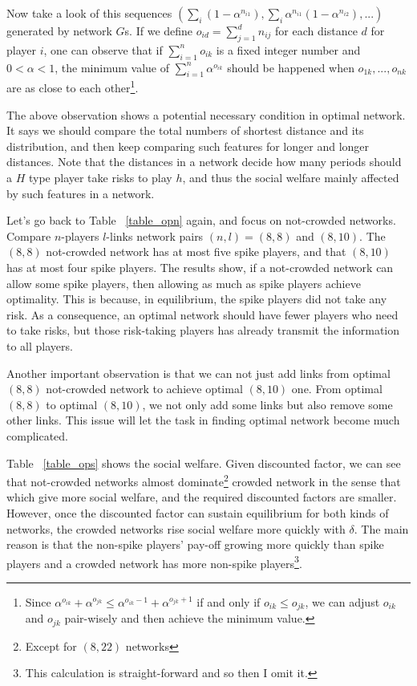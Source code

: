 \documentclass[12pt,letter]{article}
\theoremstyle{remark}
\theoremstyle{remark}
\theoremstyle{claim}
\begin{document}
Now take a look of this sequences $(\sum_i(1-\alpha^{n_{i1}}), \sum_i\alpha^{n_{i1}}(1-\alpha^{n_{i2}}),...)$ generated by network $G$s. If we define $o_{id}=\sum^d_{j=1} n_{ij}$ for each distance $d$ for player $i$, one can observe that if $\sum^n_{i=1} o_{ik}$ is a fixed integer number and $0<\alpha<1$, the minimum value of $\sum^n_{i=1}\alpha^{o_{ik}}$ should be happened when $o_{1k},...,o_{nk}$ are as close to each other\footnote{Since $\alpha^{o_{ik}}+\alpha^{o_{jk}}\leq \alpha^{o_{ik}-1}+\alpha^{o_{jk}+1}$ if and only if $o_{ik}\leq o_{jk}$, we can adjust $o_{ik}$ and $o_{jk}$ pair-wisely and then achieve the minimum value.}. 

The above observation shows a potential necessary condition in optimal network. It says we should compare the total numbers of shortest distance and its distribution, and then keep comparing such features for longer and longer distances. Note that the distances in a network decide how many periods should a $H$ type player take risks to play $h$, and thus the social welfare mainly affected by such features in a network.  

Let's go back to Table ~\ref{table_opn} again, and focus on not-crowded networks. Compare $n$-players $l$-links network pairs $(n,l)=(8,8)$ and $(8,10)$. The $(8,8)$ not-crowded network has at most five spike players, and that $(8,10)$ has at most four spike players. The results show, if a not-crowded network can allow some spike players, then allowing as much as spike players achieve optimality. This is because, in equilibrium, the spike players did not take any risk. As a consequence, an optimal network should have fewer players who need to take risks, but those risk-taking players has already transmit the information to all players. 

Another important observation is that we can not just add links from optimal $(8,8)$ not-crowded network to achieve optimal $(8,10)$ one. From optimal $(8,8)$ to optimal $(8,10)$, we not only add some links but also remove some other links. This issue will let the task in finding optimal network become much complicated. 

Table ~\ref{table_ops} shows the social welfare. Given discounted factor, we can see that not-crowded networks almost dominate\footnote{Except for $(8,22)$ networks} crowded network in the sense that which give more social welfare, and the required discounted factors are smaller. However, once the discounted factor can sustain equilibrium for both kinds of networks, the crowded networks rise social welfare more quickly with $\delta$. The main reason is that the non-spike players' pay-off growing more quickly than spike players and a crowded network has more non-spike players\footnote{This calculation is straight-forward and so then I omit it.}. 
\end{document}
